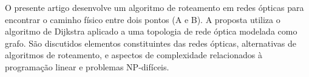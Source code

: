 \begin{resumo} 
  O presente artigo desenvolve um algoritmo de roteamento em redes ópticas
  para encontrar o caminho físico entre dois pontos (A e B).
  A proposta utiliza o algoritmo de Dijkstra aplicado a uma topologia de rede óptica modelada como grafo.
  São discutidos elementos constituintes das redes ópticas, alternativas de algoritmos de roteamento,
  e aspectos de complexidade relacionados à programação linear e problemas NP-difíceis.
\end{resumo}
